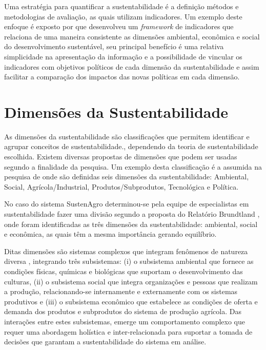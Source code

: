 Uma estratégia para quantificar a sustentabilidade é a definição métodos
e metodologias de avaliação, as quais utilizam indicadores. Um exemplo
deste enfoque é exposto por \citet{AlkanOlsson:2009} que desenvolveu
um \foreignlanguage{english}{\emph{framework}} de indicadores que
relaciona de uma maneira consistente as dimensões ambiental, econômica
e social do desenvolvimento sustentável, seu principal benefício é
uma relativa simplicidade na apresentação da informação e a possibilidade
de vincular os indicadores com objetivos políticos de cada dimensão
da sustentabilidade e assim facilitar a comparação dos impactos das
novas políticas em cada dimensão.

\section{Dimensões da Sustentabilidade}

As dimensões da sustentabilidade são classificações que permitem identificar
e agrupar conceitos de sustentabilidade\citep{AlkanOlsson:2009}.,
dependendo da teoria de sustentabilidade escolhida. Existem diversas
propostas de dimensões que podem ser usadas segundo a finalidade da
pesquisa. Um exemplo desta classificação é a assumida na pesquisa
de \citet{oliveira:2013} onde são definidas seis dimensões da sustentabilidade:
Ambiental, Social, Agrícola/Industrial, Produtos/Subprodutos, Tecnológica
e Política.

No caso do sistema SustenAgro determinou-se pela equipe de especialistas
em sustentabilidade fazer uma divisão segundo a proposta do Relatório
Brundtland \citep{brundtland1987our}, onde foram identificadas as
três dimensões da sustentabilidade: ambiental, social e econômica,
as quais têm a mesma importância gerando equilíbrio.

Ditas dimensões são sistemas complexos que integram fenômenos de natureza
diversa \citep{simon1991architecture}, integrando três subsistemas:
(i) o subsistema ambiental que fornece as condições físicas, químicas
e biológicas que suportam o desenvolvimento das culturas, (ii) o subsistema
social que integra organizações e pessoas que realizam a produção,
relacionando-se internamente e externamente com os sistemas produtivos
e (iii) o subsistema econômico que estabelece as condições de oferta
e demanda dos produtos e subprodutos do sistema de produção agrícola.
Das interações entre estes subsistemas, emerge um comportamento complexo
que requer uma abordagem holística e inter-relacionada para suportar
a tomada de decisões que garantam a sustentabilidade do sistema em
análise.

